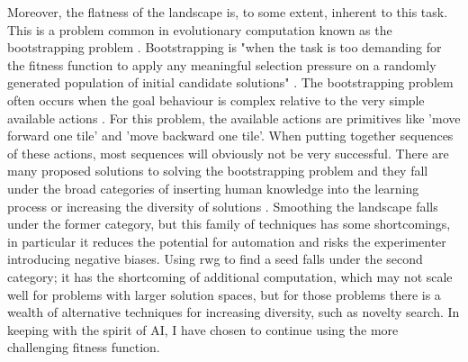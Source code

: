 \documentclass[12pt]{article}
\begin{document}
Moreover, the flatness of the landscape is, to some extent, inherent to this task.
This is a problem common in evolutionary computation known as the bootstrapping problem \cite{Silva:EC:2016, Wei:ALR:2019}.
Bootstrapping is "when the task is too demanding for the fitness function to apply any meaningful selection pressure on a randomly generated population of initial candidate solutions" \cite{Silva:EC:2016}.
The bootstrapping problem often occurs when the goal behaviour is complex relative to the very simple available actions \cite{Wei:ALR:2019}.
For this problem, the available actions are primitives like 'move forward one tile' and 'move backward one tile'.
When putting together sequences of these actions, most sequences will obviously not be very successful.
There are many proposed solutions to solving the bootstrapping problem and they fall under the broad categories of inserting human knowledge into the learning process or increasing the diversity of solutions \cite{Silva:EC:2016}.
Smoothing the landscape falls under the former category, but this family of techniques has some shortcomings, in particular it reduces the potential for automation and risks the experimenter introducing negative biases.
Using rwg to find a seed falls under the second category; it has the shortcoming of additional computation, which may not scale well for problems with larger solution spaces, but for those problems there is a wealth of alternative techniques for increasing diversity, such as novelty search.
In keeping with the spirit of AI, I have chosen to continue using the more challenging fitness function.
\end{document}
